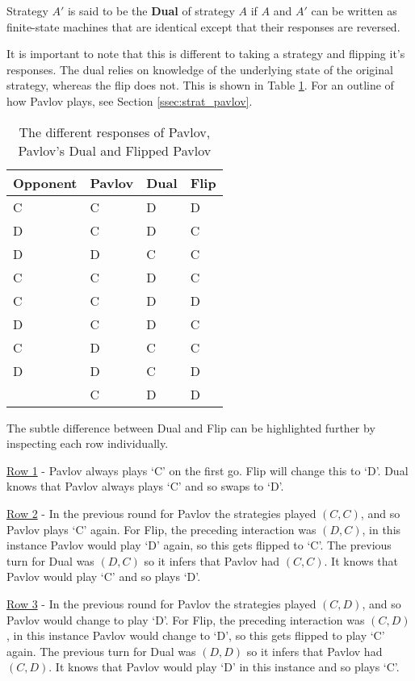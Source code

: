 \begin{definition}\label{def:dual}
Strategy $A'$ is said to be the \textbf{Dual} of strategy $A$ if $A$ and $A'$ can be written as finite-state machines that are identical except that their responses are reversed.
\end{definition}

It is important to note that this is different to taking a strategy and flipping it's responses.
The dual relies on knowledge of the underlying state of the original strategy, whereas the flip does not.
This is shown in Table \ref{tab:strat-dual-flip}.
For an outline of how Pavlov plays, see Section \ref{ssec:strat_pavlov}.

\begin{table}[htbp]
\centering
\begin{tabular}{l l l l}
\toprule
Opponent & Pavlov & Dual & Flip \\
\midrule
C & C & D & D \\
D & C & D & C \\
D & D & C & C \\
C & C & D & C \\
C & C & D & D \\
D & C & D & C \\
C & D & C & C \\
D & D & C & D \\
  & C & D & D \\
\bottomrule
\end{tabular}
\caption{The different responses of Pavlov, Pavlov's Dual and Flipped Pavlov}
\label{tab:strat-dual-flip}
\end{table}

The subtle difference between Dual and Flip can be highlighted further by inspecting each row individually.

\underline{Row 1} - Pavlov always plays `C' on the first go.
Flip will change this to `D'.
Dual knows that Pavlov always plays `C' and so swaps to `D'.

\underline{Row 2} - In the previous round for Pavlov the strategies played $(C, C)$, and so Pavlov plays `C' again.
For Flip, the preceding interaction was $(D, C)$, in this instance Pavlov would play `D' again, so this gets flipped to `C'.
The previous turn for Dual was $(D, C)$ so it infers that Pavlov had $(C, C)$.
It knows that Pavlov would play `C' and so plays `D'.

\underline{Row 3} - In the previous round for Pavlov the strategies played $(C, D)$, and so Pavlov would change to play `D'.
For Flip, the preceding interaction was $(C, D)$, in this instance Pavlov would change to `D', so this gets flipped to play `C' again.
The previous turn for Dual was $(D, D)$ so it infers that Pavlov had $(C, D)$.
It knows that Pavlov would play `D' in this instance and so plays `C'.

